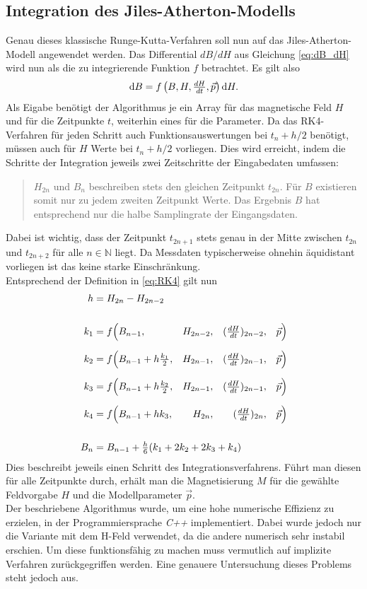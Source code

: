 \documentclass{scrartcl}
\begin{document}
\subsection{Integration des Jiles-Atherton-Modells}
Genau dieses klassische Runge-Kutta-Verfahren soll nun auf das Jiles-Atherton-Modell angewendet werden. Das Differential $dB/dH$ aus Gleichung \ref{eq:dB_dH} wird nun als die zu integrierende Funktion $f$ betrachtet. Es gilt also
\begin{equation}
	\mathop{}\!\mathrm{d} B = f\left(B, H, \tfrac{dH}{dt}, \vec{p}\right)\mathop{}\!\mathrm{d} H.
\end{equation}
Als Eigabe benötigt der Algorithmus je ein Array für das magnetische Feld $H$ und für die Zeitpunkte $t$, weiterhin eines für die Parameter. Da das RK4-Verfahren für jeden Schritt auch Funktionsauswertungen bei $t_n + h/2$ benötigt, müssen auch für $H$ Werte bei $t_n + h/2$ vorliegen. Dies wird erreicht, indem die Schritte der Integration jeweils zwei Zeitschritte der Eingabedaten umfassen:
\begin{quote}
	$H_{2n}$ und $B_n$ beschreiben stets den gleichen Zeitpunkt $t_{2n}$. Für $B$ existieren somit nur zu jedem zweiten Zeitpunkt Werte. Das Ergebnis $B$ hat entsprechend nur die halbe Samplingrate der Eingangsdaten.
\end{quote}
Dabei ist wichtig, dass der Zeitpunkt $t_{2n+1}$ stets genau in der Mitte zwischen $t_{2n}$ und $t_{2n+2}$ für alle $n \in \mathbb{N}$ liegt. Da Messdaten typischerweise ohnehin äquidistant vorliegen ist das keine starke Einschränkung.\\
Entsprechend der Definition in \ref{eq:RK4} gilt nun
\begin{equation}
\begin{aligned}
	h &= H_{2n} - H_{2n - 2} \span\span\span\span\span\\[0.5cm]
	k_1 &= f\Big(B_{n-1}, &{} H_{2n-2}, &&{} (\tfrac{dH}{dt})_{2n-2},&&{}\vec{p}\Big)\\[0.2cm]
	k_2 &= f\Big(B_{n-1} + h\tfrac{k_1}{2},&{} H_{2n-1},&&{} (\tfrac{dH}{dt})_{2n-1},&&{}\vec{p}\Big)\\[0.2cm]
	k_3 &= f\Big(B_{n-1} + h\tfrac{k_2}{2},&{} H_{2n-1},&&{} (\tfrac{dH}{dt})_{2n-1},&&{} \vec{p}\Big)\\[0.2cm]
	k_4 &= f\Big(B_{n-1} + h k_3, &{} H_{2n}, &&{} (\tfrac{dH}{dt})_{2n},&&{}\vec{p}\Big)\\[0.5cm]
	B_n &= B_{n-1} + \tfrac{h}{6}(k_1 + 2k_2 + 2k_3 + k_4)  \span\span\span\span\span
\end{aligned}
\end{equation}
Dies beschreibt jeweils einen Schritt des Integrationsverfahrens. Führt man diesen für alle Zeitpunkte durch, erhält man die Magnetisierung $M$ für die gewählte Feldvorgabe $H$ und die Modellparameter $\vec{p}$.\\
Der beschriebene Algorithmus wurde, um eine hohe numerische Effizienz zu erzielen, in der Programmiersprache \emph{C++} implementiert. Dabei wurde jedoch nur die Variante mit dem H-Feld verwendet, da die andere numerisch sehr instabil erschien. Um diese funktionsfähig zu machen muss vermutlich auf implizite Verfahren zurückgegriffen werden. Eine genauere Untersuchung dieses Problems steht jedoch aus.
\end{document}
